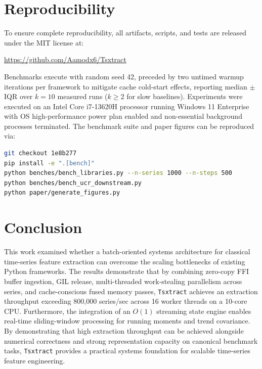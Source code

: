 \documentclass[conference]{IEEEtran}
\newcommand{\tsxtract}{\texttt{Tsxtract}}
\begin{document}
\section{Reproducibility}
\label{sec:reproducibility}
To ensure complete reproducibility, all artifacts, scripts, and tests are released under the MIT license at:
\begin{center}
\url{https://github.com/Aamodx6/Tsxtract}
\end{center}
Benchmarks execute with random seed 42, preceded by two untimed warmup iterations per framework to mitigate cache cold-start effects, reporting median $\pm$ IQR over $k=10$ measured runs ($k \ge 2$ for slow baselines). Experiments were executed on an Intel Core i7-13620H processor running Windows 11 Enterprise with OS high-performance power plan enabled and non-essential background processes terminated. The benchmark suite and paper figures can be reproduced via:
\begin{lstlisting}[language=bash]
git checkout 1e8b277
pip install -e ".[bench]"
python benches/bench_libraries.py --n-series 1000 --n-steps 500
python benches/bench_ucr_downstream.py
python paper/generate_figures.py
\end{lstlisting}

\section{Conclusion}
\label{sec:conclusion}
This work examined whether a batch-oriented systems architecture for classical time-series feature extraction can overcome the scaling bottlenecks of existing Python frameworks. The results demonstrate that by combining zero-copy FFI buffer ingestion, GIL release, multi-threaded work-stealing parallelism across series, and cache-conscious fused memory passes, \tsxtract{} achieves an extraction throughput exceeding 800,000 series/sec across 16 worker threads on a 10-core CPU. Furthermore, the integration of an $O(1)$ streaming state engine enables real-time sliding-window processing for running moments and trend covariance. By demonstrating that high extraction throughput can be achieved alongside numerical correctness and strong representation capacity on canonical benchmark tasks, \tsxtract{} provides a practical systems foundation for scalable time-series feature engineering.
\end{document}
